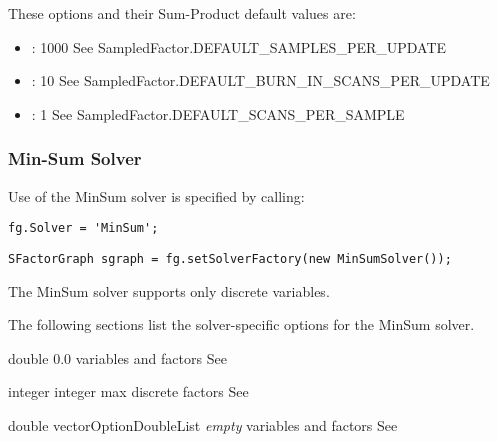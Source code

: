 These options and their Sum-Product default values are:

\begin{itemize}
\item {}: 1000 \ifjava See SampledFactor.DEFAULT\_SAMPLES\_PER\_UPDATE\fi
\item {}: 10 \ifjava See SampledFactor.DEFAULT\_BURN\_IN\_SCANS\_PER\_UPDATE\fi
\item {}: 1 \ifjava See SampledFactor.DEFAULT\_SCANS\_PER\_SAMPLE\fi
\end{itemize}

\clearpage
\subsubsection{Min-Sum Solver}

Use of the MinSum solver is specified by calling:

\ifmatlab
\begin{lstlisting}
fg.Solver = 'MinSum';
\end{lstlisting}
\fi

\ifjava
\begin{lstlisting}
SFactorGraph sgraph = fg.setSolverFactory(new MinSumSolver());
\end{lstlisting}
\fi

The MinSum solver supports only discrete variables.

\label{sec:MinSumOptions}

The following sections list the solver-specific options for the MinSum solver.


{double}
{0.0}
{variables and factors}
{See }


{integer}
{integer max}
{discrete factors}
{See }


{\ifmatlab double vector\fi \ifjava OptionDoubleList\fi}
{\textit{empty}}
{variables and factors}
{See }

